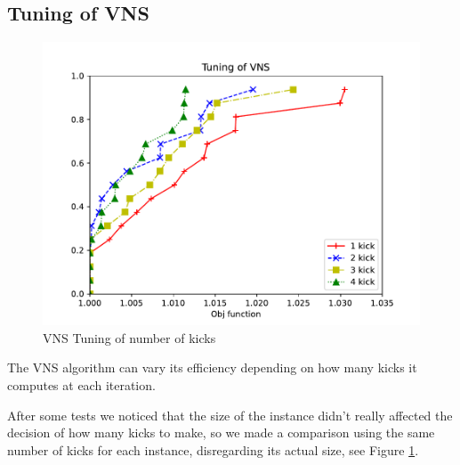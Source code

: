 \subsection{Tuning of VNS}

\begin{figure}[!h]
    \centering
    \includegraphics[width=\textwidth]{images/vns.pdf}
    \caption{VNS Tuning of number of kicks}
    \label{fig:vns}
\end{figure}

The VNS algorithm can vary its efficiency depending on how many kicks it computes at each iteration.

After some tests we noticed that the size of the instance didn't really affected the decision of how many kicks to make, so we made a comparison using the same number of kicks for each instance, disregarding its actual size, see Figure \ref{fig:vns}.

